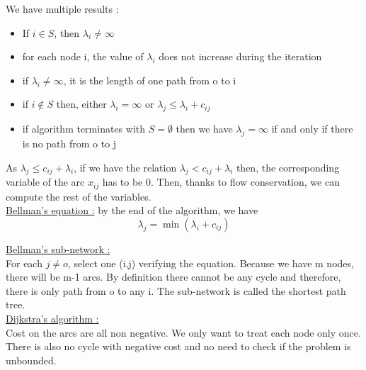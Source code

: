 \documentclass[../main.tex]{subfiles}
\begin{document}
We have multiple results : \begin{itemize}
    \item If $i \in S$, then $\lambda_i \neq \infty$\\
    \item for each node i, the value of $\lambda_i$ does not increase during the iteration\\
    \item if $\lambda_i \neq \infty$, it is the length of one path from o to i\\
    \item if $i \notin S$ then, either $\lambda_i = \infty$ or $\lambda_j \leq \lambda_i + c_{ij}$\\
    \item if algorithm terminates with $S=\emptyset$ then we have $\lambda_j = \infty$ if and only if there is no path from o to j\\
\end{itemize}

\warning As $\lambda_j \leq c_{ij}+\lambda_i$, if we have the relation $\lambda_j< c_{ij}+\lambda_i$ then, the corresponding variable of the arc $x_{ij}$ has to be 0. Then, thanks to flow conservation, we can compute the rest of the variables.\\

\quad \underline{Bellman's equation :} by the end of the algorithm, we have \begin{equation}
    \lambda_j = \min(\lambda_i + c_{ij})
\end{equation}

\quad \underline{Bellman's sub-network :}\\
For each $j\neq o$, select one (i,j) verifying the equation. Because we have m nodes, there will be m-1 arcs. By definition there cannot be any cycle and therefore, there is only path from o to any i. The sub-network is called the shortest path tree.\\

\quad \underline{Dijkstra's algorithm :}\\
Cost on the arcs are all non negative. We only want to treat each node only once. There is also no cycle with negative cost and no need to check if the problem is unbounded.\\
\end{document}
